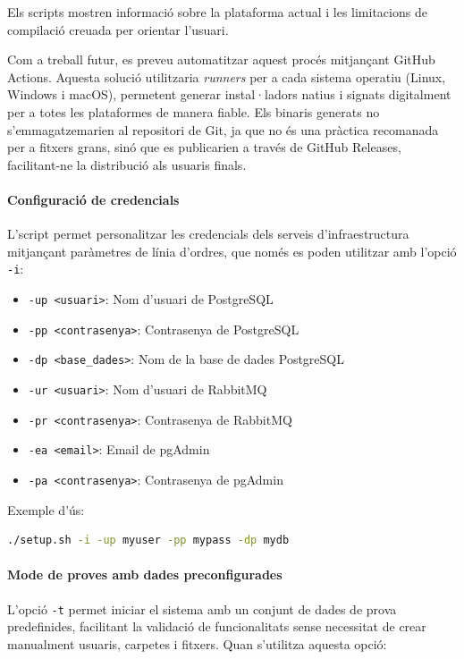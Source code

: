 Els scripts mostren informació sobre la plataforma actual i les limitacions de compilació creuada per orientar l'usuari.

Com a treball futur, es preveu automatitzar aquest procés mitjançant GitHub Actions. Aquesta solució utilitzaria \textit{runners} per a cada sistema operatiu (Linux, Windows i macOS), permetent generar instal·ladors natius i signats digitalment per a totes les plataformes de manera fiable. Els binaris generats no s'emmagatzemarien al repositori de Git, ja que no és una pràctica recomanada per a fitxers grans, sinó que es publicarien a través de GitHub Releases, facilitant-ne la distribució als usuaris finals.

\paragraph{Configuració de credencials}

L'script permet personalitzar les credencials dels serveis d'infraestructura mitjançant paràmetres de línia d'ordres, que només es poden utilitzar amb l'opció \texttt{-i}:

\begin{itemize}
  \item \texttt{-up <usuari>}: Nom d'usuari de PostgreSQL
  \item \texttt{-pp <contrasenya>}: Contrasenya de PostgreSQL
  \item \texttt{-dp <base\_dades>}: Nom de la base de dades PostgreSQL
  \item \texttt{-ur <usuari>}: Nom d'usuari de RabbitMQ
  \item \texttt{-pr <contrasenya>}: Contrasenya de RabbitMQ
  \item \texttt{-ea <email>}: Email de pgAdmin
  \item \texttt{-pa <contrasenya>}: Contrasenya de pgAdmin
\end{itemize}

Exemple d'ús:
\begin{lstlisting}[language=bash]
./setup.sh -i -up myuser -pp mypass -dp mydb
\end{lstlisting}

\paragraph{Mode de proves amb dades preconfigurades}

L'opció \texttt{-t} permet iniciar el sistema amb un conjunt de dades de prova predefinides, facilitant la validació de funcionalitats sense necessitat de crear manualment usuaris, carpetes i fitxers. Quan s'utilitza aquesta opció:


